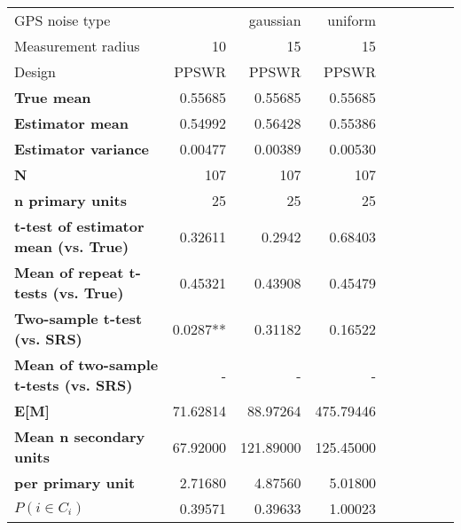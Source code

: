 \begin{tabular}{l|r|rrr|r|rrr}
\toprule
GPS noise type & \multicolumn{2}{r}{gaussian} & uniform \\
Measurement radius & 10 & 15 & 15 \\
Design & PPSWR & PPSWR & PPSWR \\
\midrule
\textbf{True mean} &  0.55685 &  0.55685 &  0.55685 \\
\textbf{Estimator mean} & 0.54992 & 0.56428 & 0.55386 \\
\textbf{Estimator variance} & 0.00477 & 0.00389 & 0.00530 \\
\textbf{N} & 107 & 107 & 107 \\
\textbf{n primary units} & 25 & 25 & 25 \\
\textbf{t-test of estimator mean (vs. True)} & 0.32611 & 0.2942 & 0.68403 \\
\textbf{Mean of repeat t-tests (vs. True)} & 0.45321 & 0.43908 & 0.45479 \\
\textbf{Two-sample t-test (vs. SRS)} & 0.0287** & 0.31182 & 0.16522 \\
\textbf{Mean of two-sample t-tests (vs. SRS)} & - & - & - \\
\textbf{E[M]} & 71.62814 & 88.97264 & 475.79446 \\
\textbf{Mean n secondary units} & 67.92000 & 121.89000 & 125.45000 \\
\textbf{     per primary unit} & 2.71680 & 4.87560 & 5.01800 \\
\textbf{$P(i \in C_i)$} & 0.39571 & 0.39633 & 1.00023 \\
\bottomrule
\end{tabular}
